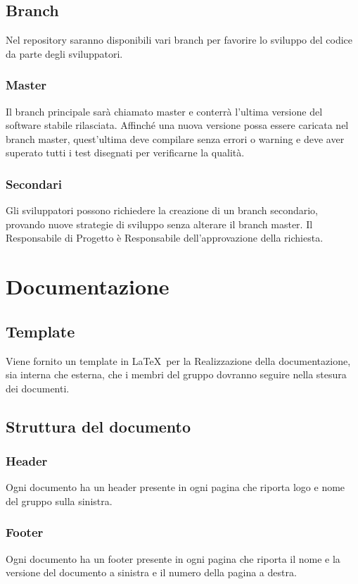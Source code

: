 \subsection{Branch}
\label{4.4}
Nel repository saranno disponibili vari branch per favorire lo sviluppo del codice da parte degli sviluppatori.

\subsubsection{Master}
\label{4.4.1}
Il branch principale sarà chiamato master e conterrà l'ultima versione del software stabile rilasciata. Affinché una nuova versione possa essere caricata nel branch master, quest'ultima deve compilare senza errori o warning e deve aver superato tutti i test disegnati per verificarne la qualità.

\subsubsection{Secondari}
\label{4.4.2}
Gli sviluppatori possono richiedere la creazione di un branch secondario, provando nuove strategie di sviluppo senza alterare il branch master. Il Responsabile di Progetto è Responsabile dell'approvazione della richiesta.

\newpage
\section{Documentazione}
\label{5.0}

\subsection{Template}
\label{5.1}
Viene fornito un template in \LaTeX\ per la Realizzazione della documentazione, sia interna che esterna, che i membri del gruppo dovranno seguire nella stesura dei documenti.

\subsection{Struttura del documento}
\label{5.2}

\subsubsection{Header}
\label{5.2.1}
Ogni documento ha un header presente in ogni pagina che riporta logo e nome del gruppo sulla sinistra.

\subsubsection{Footer}
\label{5.2.2}
Ogni documento ha un footer presente in ogni pagina che riporta il nome e la versione del documento a sinistra e il numero della pagina a destra.

